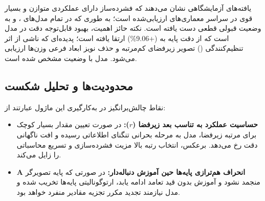 یافته‌های آزمایشگاهی نشان می‌دهند که فشرده‌ساز  دارای عملکردی متوازن و بسیار قوی در سراسر معماری‌های ارزیابی‌شده است؛ به طوری که در تمام مدل‌های ،  و  به وضعیت قبولی قطعی  دست یافته است. نکته حائز اهمیت، بهبود قابل‌توجه دقت در مدل  است که از دقت پایه  به  (+9.06\%) ارتقا یافته است؛ پدیده‌ای که ناشی از اثر تنظیم‌کنندگی () تصویر زیرفضای کم‌مرتبه و حذف نویز ابعاد فرعی وزن‌ها ارزیابی می‌شود. مدل  با وضعیت  مشخص شده است.

\subsection{محدودیت‌ها و تحلیل شکست}
نقاط چالش‌برانگیز در به‌کارگیری این ماژول عبارتند از:
\begin{itemize}
    \item \textbf{حساسیت عملکرد به تناسب بعد زیرفضا ($r$):} در صورت تعیین مقدار بسیار کوچک برای مرتبه زیرفضا، مدل به مرحله بحرانی تنگنای اطلاعاتی رسیده و افت ناگهانی دقت رخ می‌دهد. برعکس، انتخاب رتبه بالا مزیت فشرده‌سازی و تسریع محاسباتی را زایل می‌کند.
    \item \textbf{انحراف هم‌ترازی پایه‌ها حین آموزش دنباله‌دار:} در صورتی که پایه تصویرگر $\mathbf{A}$ منجمد نشود و آموزش بدون قید تعامد ادامه یابد، ارتوگونالیتی پایه‌ها تخریب شده و مدل نیازمند تجدید مکرر تجزیه مقادیر منفرد خواهد بود.
\end{itemize}
